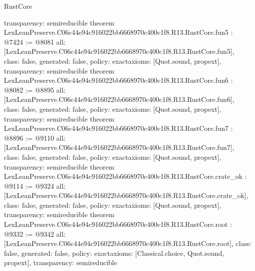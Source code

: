 \begin{lexlean}{RustCore}
\begin{coremodule}
{  transparency: semireducible
}
theorem LexLeanPreserve.C06c44e94c916022bb6668970c400c1f8.R13.RustCore.fun5 : @7424 := @8081 {
  all: [LexLeanPreserve.C06c44e94c916022bb6668970c400c1f8.R13.RustCore.fun5],
  class: false,
  generated: false,
  policy: exact{axioms: [Quot.sound, propext]},
  transparency: semireducible
}
theorem LexLeanPreserve.C06c44e94c916022bb6668970c400c1f8.R13.RustCore.fun6 : @8082 := @8895 {
  all: [LexLeanPreserve.C06c44e94c916022bb6668970c400c1f8.R13.RustCore.fun6],
  class: false,
  generated: false,
  policy: exact{axioms: [Quot.sound, propext]},
  transparency: semireducible
}
theorem LexLeanPreserve.C06c44e94c916022bb6668970c400c1f8.R13.RustCore.fun7 : @8896 := @9110 {
  all: [LexLeanPreserve.C06c44e94c916022bb6668970c400c1f8.R13.RustCore.fun7],
  class: false,
  generated: false,
  policy: exact{axioms: [Quot.sound, propext]},
  transparency: semireducible
}
theorem LexLeanPreserve.C06c44e94c916022bb6668970c400c1f8.R13.RustCore.crate_ok : @9114 := @9324 {
  all: [LexLeanPreserve.C06c44e94c916022bb6668970c400c1f8.R13.RustCore.crate_ok],
  class: false,
  generated: false,
  policy: exact{axioms: [Quot.sound, propext]},
  transparency: semireducible
}
theorem LexLeanPreserve.C06c44e94c916022bb6668970c400c1f8.R13.RustCore.root : @9332 := @9342 {
  all: [LexLeanPreserve.C06c44e94c916022bb6668970c400c1f8.R13.RustCore.root],
  class: false,
  generated: false,
  policy: exact{axioms: [Classical.choice, Quot.sound, propext]},
  transparency: semireducible
}


\end{coremodule}
\end{lexlean}
